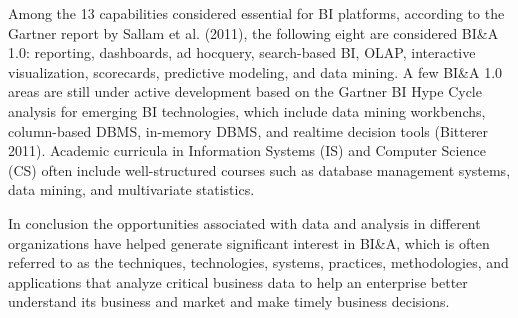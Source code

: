 Among the 13 capabilities considered essential for BI platforms, according to the Gartner report by Sallam et al. (2011),
the following eight are considered BI\&A 1.0: reporting,
dashboards, ad hocquery, search-based BI, OLAP, interactive
visualization, scorecards, predictive modeling, and data
mining. A few BI\&A 1.0 areas are still under active development based on the Gartner BI Hype Cycle analysis for
emerging BI technologies, which include data mining workbenchs, column-based DBMS, in-memory DBMS, and realtime decision tools (Bitterer 2011). Academic curricula in
Information Systems (IS) and Computer Science (CS) often include well-structured courses such as database management
systems, data mining, and multivariate statistics.

In conclusion the opportunities associated with data and analysis in different organizations have helped generate significant interest
in BI\&A, which is often referred to as the techniques, technologies, systems, practices, methodologies, and applications
that analyze critical business data to help an enterprise better
understand its business and market and make timely business
decisions. 